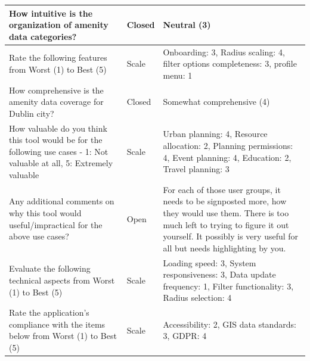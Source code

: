\begin{table}[h!]
\begin{tabular}{|p{}|p{}|p{}|}
        \hline
        How intuitive is the organization of amenity data categories?                                                            & Closed                 & Neutral (3)                                                                                                                                                                                                           \\
        \hline
        Rate the following features from Worst (1) to Best (5)                                                                   & Scale                  & Onboarding: 3, Radius scaling: 4, filter options completeness: 3, profile menu: 1                                                                                                                                     \\
        \hline
        How comprehensive is the amenity data coverage for Dublin city?                                                          & Closed                 & Somewhat comprehensive (4)                                                                                                                                                                                            \\
        \hline
        How valuable do you think this tool would be for the following use cases - 1: Not valuable at all, 5: Extremely valuable & Scale                  & Urban planning: 4, Resource allocation: 2, Planning permissions: 4, Event planning: 4, Education: 2, Travel planning: 3                                                                                               \\
        \hline
        Any additional comments on why this tool would useful/impractical for the above use cases?                               & Open                   & For each of those user groups, it needs to be signposted more, how they would use them. There is too much left to trying to figure it out yourself. It possibly is very useful for all but needs highlighting by you. \\
        \hline
        Evaluate the following technical aspects from Worst (1) to Best (5)                                                      & Scale                  & Loading speed: 3, System responsiveness: 3, Data update frequency: 1, Filter functionality: 3, Radius selection: 4                                                                                                    \\
        \hline
        Rate the application's compliance with the items below from Worst (1) to Best (5)                                        & Scale                  & Accessibility: 2, GIS data standards: 3, GDPR: 4                                                                                                                                                                      \\

\end{tabular}
\end{table}
